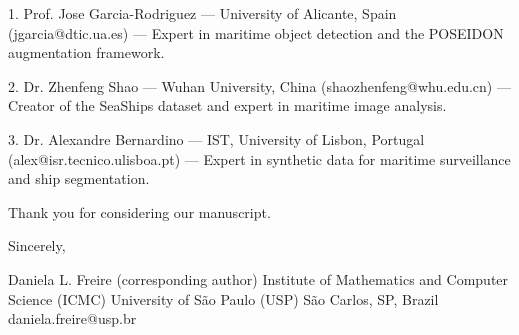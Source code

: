 1. Prof. Jose Garcia-Rodriguez — University of Alicante, Spain (jgarcia@dtic.ua.es) — Expert in maritime object detection and the POSEIDON augmentation framework.

2. Dr. Zhenfeng Shao — Wuhan University, China (shaozhenfeng@whu.edu.cn) — Creator of the SeaShips dataset and expert in maritime image analysis.

3. Dr. Alexandre Bernardino — IST, University of Lisbon, Portugal (alex@isr.tecnico.ulisboa.pt) — Expert in synthetic data for maritime surveillance and ship segmentation.

Thank you for considering our manuscript.

Sincerely,

Daniela L. Freire (corresponding author)
Institute of Mathematics and Computer Science (ICMC)
University of São Paulo (USP)
São Carlos, SP, Brazil
daniela.freire@usp.br
